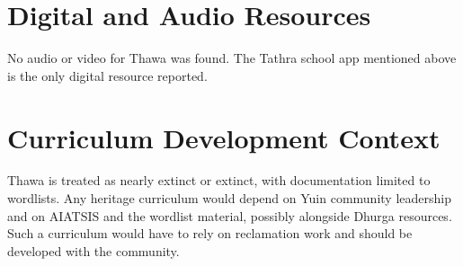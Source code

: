 \documentclass[12pt]{article}
\begin{document}
\section{Digital and Audio Resources}
No audio or video for Thawa was found. The Tathra school app mentioned above is the only digital resource reported.

\section{Curriculum Development Context}
Thawa is treated as nearly extinct or extinct, with documentation limited to wordlists. Any heritage curriculum would depend on Yuin community leadership and on AIATSIS and the wordlist material, possibly alongside Dhurga resources. Such a curriculum would have to rely on reclamation work and should be developed with the community.
\end{document}
